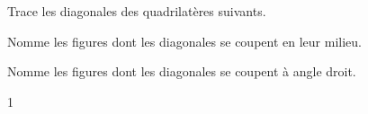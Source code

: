 \documentclass[a4paper,11pt]{report}
\begin{document}
\begin{exop}{
\begin{tasks}
    \task Trace les diagonales des quadrilatères suivants.
	    \vspace{-0.2cm}
    \begin{center}
    
    \end{center}
    
    \task Nomme les figures dont les diagonales se coupent en leur milieu. 

    \task Nomme les figures dont les diagonales se coupent à angle droit. 


\end{tasks}
    
}{1}
\end{exop}



\newpage
\end{document}
